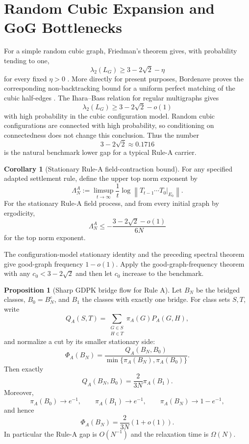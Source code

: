 \documentclass[11pt]{article}
\makeatletter
\newcommand{\norm}[1]{\left\|#1\right\|}
\theoremstyle{definition}
\newtheorem{proposition}[theorem]{Proposition}
\newtheorem{corollary}[theorem]{Corollary}
\renewenvironment{proof}[1][\proofname]{\par
  \pushQED{\qed}%
  \normalfont \topsep6\p@\@plus6\p@\relax
  \trivlist
  \item[\hskip\labelsep\bfseries #1\@addpunct{.}]\ignorespaces
}{%
  \popQED\endtrivlist\@endpefalse
}
\makeatother
\begin{document}
\section{Random Cubic Expansion and GoG Bottlenecks}

For a simple random cubic graph, Friedman's theorem gives, with probability
tending to one,
\[
    \lambda_2(L_G)
    \ge
    3-2\sqrt2-\eta
\]
for every fixed $\eta>0$ \cite{friedman}.  More directly for present purposes,
Bordenave proves the corresponding non-backtracking bound for a uniform
perfect matching of the cubic half-edges \cite{bordenave}.  The Ihara--Bass
relation for regular multigraphs gives
\[
    \lambda_2(L_G)\ge 3-2\sqrt2-o(1)
\]
with high probability in the cubic configuration model.  Random cubic
configurations are connected with high probability, so conditioning on
connectedness does not change this conclusion.  Thus the number
\[
    3-2\sqrt2\approx 0.1716
\]
is the natural benchmark lower gap for a typical Rule-A carrier.

\begin{corollary}[Stationary Rule-A field-contraction bound]
For any specified adapted settlement rule, define the upper top norm exponent
by
\[
 \Lambda_N^A:=\limsup_{t\to\infty}\frac1t
 \log\norm{T_{t-1}\cdots T_0|_{E_0}}.
\]
For the stationary Rule-A field process, and from every initial graph by
ergodicity,
\[
    \Lambda_N^A
    \le
    -\frac{3-2\sqrt2-o(1)}{6N}
\]
for the top norm exponent.
\end{corollary}

\begin{proof}
The configuration-model stationary identity and the preceding spectral theorem
give good-graph frequency $1-o(1)$.  Apply the good-graph-frequency theorem
with any $c_0<3-2\sqrt2$ and then let $c_0$ increase to the benchmark.
\end{proof}

\begin{proposition}[Sharp GDPK bridge flow for Rule A]
Let $B_N$ be the bridged classes, $B_0=B_N^c$, and $B_1$ the classes with
exactly one bridge.  For class sets $S,T$, write
\[
 Q_A(S,T)=\sum_{\substack{G\in S\\H\in T}}\pi_A(G)P_A(G,H),
\]
and normalize a cut by its smaller stationary side:
\[
 \Phi_A(B_N)=
 \frac{Q_A(B_N,B_0)}{\min\{\pi_A(B_N),\pi_A(B_0)\}}.
\]
Then exactly
\[
    Q_A(B_N,B_0)=\frac{2}{3N}\pi_A(B_1).
\]
Moreover,
\[
 \pi_A(B_0)\to e^{-1},\qquad
 \pi_A(B_1)\to e^{-1},\qquad
 \pi_A(B_N)\to1-e^{-1},
\]
and hence
\[
    \Phi_A(B_N)=\frac{2}{3N}(1+o(1)).
\]
In particular the Rule-A gap is $O(N^{-1})$ and the relaxation time is
$\Omega(N)$.
\end{proposition}
\end{document}
